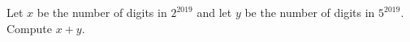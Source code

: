 Let $x$ be the number of digits in $2^{2019}$ and let $y$ be the number of digits in $5^{2019}$. Compute $x + y$.
